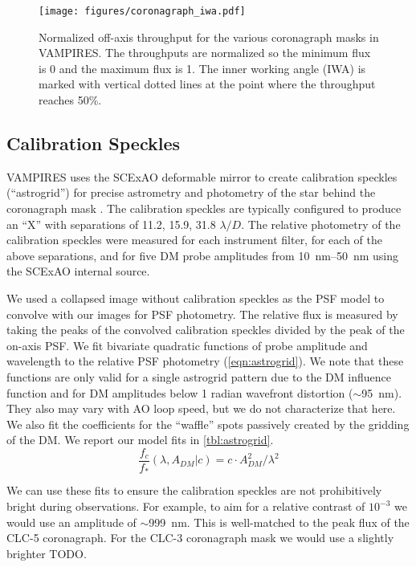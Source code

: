 \begin{figure}
    \centering
    \texttt{[image: figures/coronagraph\_iwa.pdf]}
    \caption{Normalized off-axis throughput for the various coronagraph masks in VAMPIRES. The throughputs are normalized so the minimum flux is 0 and the maximum flux is 1. The inner working angle (IWA) is marked with vertical dotted lines at the point where the throughput reaches 50\%.\label{fig:iwa}}
\end{figure}

\subsection{Calibration Speckles}

VAMPIRES uses the SCExAO deformable mirror to create calibration speckles (``astrogrid'') for precise astrometry and photometry of the star behind the coronagraph mask \citep{sahoo_precision_2020}. The calibration speckles are typically configured to produce an ``X'' with separations of 11.2, 15.9, 31.8 $\lambda/D$. The relative photometry of the calibration speckles were measured for each instrument filter, for each of the above separations, and for five DM probe amplitudes from \SIrange{10}{50}{\nano\meter} using the SCExAO internal source. 

We used a collapsed image without calibration speckles as the PSF model to convolve with our images for PSF photometry. The relative flux is measured by taking the peaks of the convolved calibration speckles divided by the peak of the on-axis PSF. We fit bivariate quadratic functions of probe amplitude and wavelength to the relative PSF photometry (\autoref{eqn:astrogrid}). We note that these functions are only valid for a single astrogrid pattern due to the DM influence function and for DM amplitudes below 1 radian wavefront distortion ($\sim$\SI{95}{\nano\meter}). They also may vary with AO loop speed, but we do not characterize that here. We also fit the coefficients for the ``waffle'' spots passively created by the gridding of the DM. We report our model fits in \autoref{tbl:astrogrid}.
\begin{equation}
    \label{eqn:astrogrid}
    \frac{f_{c}}{f_*}\left( \lambda, A_{DM} | c \right) = c \cdot A_{DM}^2 / \lambda^2
\end{equation}

We can use these fits to ensure the calibration speckles are not prohibitively bright during observations. For example, to aim for a relative contrast of $10^{-3}$ we would use an amplitude of $\sim$\SI{999}{\nano\meter}. This is well-matched to the peak flux of the CLC-5 coronagraph. For the CLC-3 coronagraph mask we would use a slightly brighter TODO.

